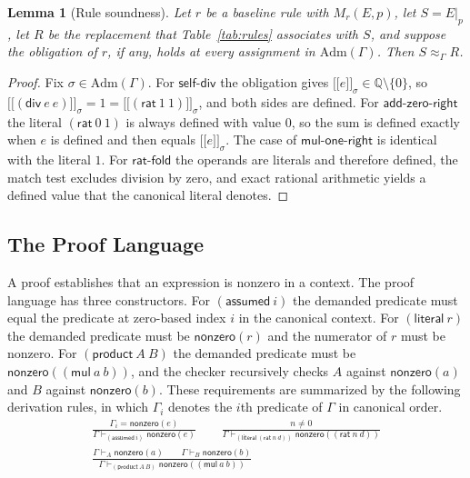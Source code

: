\documentclass[11pt,a4paper]{article}
\theoremstyle{plain}
\newtheorem{lemma}[theorem]{Lemma}
\theoremstyle{definition}
\theoremstyle{remark}
\theoremstyle{definition}
\newcommand{\Q}{\mathbb{Q}}
\newcommand{\den}[2]{\mathopen{[\![}#1\mathclose{]\!]}_{#2}}
\newcommand{\eqv}[1]{\approx_{#1}}
\newcommand{\nz}{\mathsf{nonzero}}
\newcommand{\proves}{\vdash}
\begin{document}
\begin{lemma}[Rule soundness]
\label{lem:rules}
Let $r$ be a baseline rule with $M_r(E,p)$, let $S = E|_p$, let $R$ be the replacement that Table~\ref{tab:rules} associates with $S$, and suppose the obligation of $r$, if any, holds at every assignment in $\mathrm{Adm}(\Gamma)$. Then $S \eqv{\Gamma} R$.
\end{lemma}

\begin{proof}
Fix $\sigma \in \mathrm{Adm}(\Gamma)$. For $\mathsf{self\text{-}div}$ the obligation gives $\den{e}{\sigma} \in \Q\setminus\{0\}$, so $\den{(\mathsf{div}\ e\ e)}{\sigma} = 1 = \den{(\mathsf{rat}\ 1\ 1)}{\sigma}$, and both sides are defined. For $\mathsf{add\text{-}zero\text{-}right}$ the literal $(\mathsf{rat}\ 0\ 1)$ is always defined with value $0$, so the sum is defined exactly when $e$ is defined and then equals $\den{e}{\sigma}$. The case of $\mathsf{mul\text{-}one\text{-}right}$ is identical with the literal $1$. For $\mathsf{rat\text{-}fold}$ the operands are literals and therefore defined, the match test excludes division by zero, and exact rational arithmetic yields a defined value that the canonical literal denotes.
\end{proof}

\subsection{The Proof Language}

A proof establishes that an expression is nonzero in a context. The proof language has three constructors. For $(\mathsf{assumed}\ i)$ the demanded predicate must equal the predicate at zero-based index $i$ in the canonical context. For $(\mathsf{literal}\ r)$ the demanded predicate must be $\nz(r)$ and the numerator of $r$ must be nonzero. For $(\mathsf{product}\ A\ B)$ the demanded predicate must be $\nz((\mathsf{mul}\ a\ b))$, and the checker recursively checks $A$ against $\nz(a)$ and $B$ against $\nz(b)$. These requirements are summarized by the following derivation rules, in which $\Gamma_i$ denotes the $i$th predicate of $\Gamma$ in canonical order.
\begin{gather*}
\frac{\Gamma_i = \nz(e)}{\Gamma \proves_{(\mathsf{assumed}\ i)} \nz(e)}
\qquad
\frac{n \ne 0}{\Gamma \proves_{(\mathsf{literal}\ (\mathsf{rat}\ n\ d))} \nz((\mathsf{rat}\ n\ d))}
\\[1ex]
\frac{\Gamma \proves_{A} \nz(a) \qquad \Gamma \proves_{B} \nz(b)}{\Gamma \proves_{(\mathsf{product}\ A\ B)} \nz((\mathsf{mul}\ a\ b))}
\end{gather*}
\end{document}
